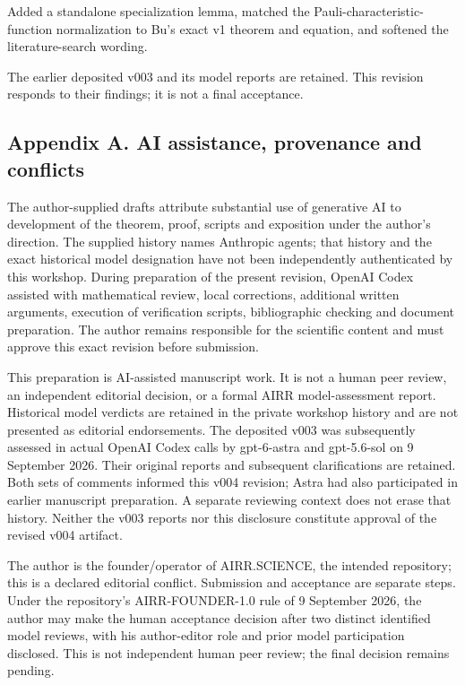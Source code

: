 \documentclass[
  11pt,
  a4paper,
]{article}
\begin{document}
Added a standalone specialization lemma, matched the
Pauli-characteristic-function normalization to Bu's exact v1 theorem and
equation, and softened the literature-search wording.

The earlier deposited v003 and its model reports are retained. This
revision responds to their findings; it is not a final acceptance.

\subsection{Appendix A. AI assistance, provenance and
conflicts}\label{appendix-a.-ai-assistance-provenance-and-conflicts}

The author-supplied drafts attribute substantial use of generative AI to
development of the theorem, proof, scripts and exposition under the
author's direction. The supplied history names Anthropic agents; that
history and the exact historical model designation have not been
independently authenticated by this workshop. During preparation of the
present revision, OpenAI Codex assisted with mathematical review, local
corrections, additional written arguments, execution of verification
scripts, bibliographic checking and document preparation. The author
remains responsible for the scientific content and must approve this
exact revision before submission.

This preparation is AI-assisted manuscript work. It is not a human peer
review, an independent editorial decision, or a formal AIRR
model-assessment report. Historical model verdicts are retained in the
private workshop history and are not presented as editorial
endorsements. The deposited v003 was subsequently assessed in actual
OpenAI Codex calls by gpt-6-astra and gpt-5.6-sol on 9 September 2026.
Their original reports and subsequent clarifications are retained. Both
sets of comments informed this v004 revision; Astra had also
participated in earlier manuscript preparation. A separate reviewing
context does not erase that history. Neither the v003 reports nor this
disclosure constitute approval of the revised v004 artifact.

The author is the founder/operator of AIRR.SCIENCE, the intended
repository; this is a declared editorial conflict. Submission and
acceptance are separate steps. Under the repository's AIRR-FOUNDER-1.0
rule of 9 September 2026, the author may make the human acceptance
decision after two distinct identified model reviews, with his
author-editor role and prior model participation disclosed. This is not
independent human peer review; the final decision remains pending.
\end{document}
